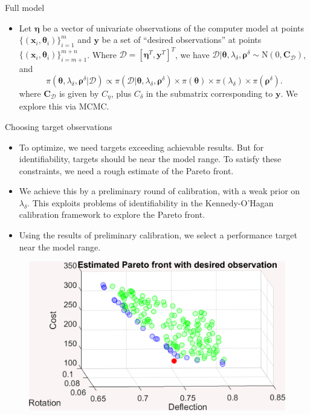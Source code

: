\documentclass[final]{beamer}
\newlength{\onecolwid}
\begin{document}
\begin{frame}[t]
\begin{columns}[t]
\begin{column}{\onecolwid}
\begin{alertblock}{Full model}
\begin{itemize}
\item Let $\boldsymbol\eta$ be a vector of univariate observations of the computer model at points $\{(\mathbf x_i,\boldsymbol\theta_i)\}_{i=1}^m$ and $\mathbf y$ be a set of ``desired observations'' at points $\{(\mathbf x_i,\boldsymbol\theta_i)\}_{i=m+1}^{m+n}$. Where $\mathcal D=[\boldsymbol\eta^T,\mathbf y^T]^T$, we have $\mathcal D|\boldsymbol \theta,\lambda_\delta,\boldsymbol\rho^\delta\sim\mathrm N(0,\mathbf C_{\mathcal D})$, and 
\[
\pi(\boldsymbol\theta,\lambda_\delta,\boldsymbol\rho^\delta|\mathcal D) \propto
\pi(\mathcal D|\boldsymbol\theta,\lambda_\delta,\boldsymbol\rho^\delta)\times
\pi(\boldsymbol\theta) \times
\pi(\lambda_\delta) \times
\pi(\boldsymbol\rho^\delta).
\]
where $\mathbf C_{\mathcal D}$ is given by $C_\eta$, plus $C_\delta$ in the submatrix corresponding to $\mathbf y$. We explore this via MCMC.

\end{itemize}

\end{alertblock} 



\begin{alertblock}{Choosing target observations}

\begin{itemize}
\item To optimize, we need targets exceeding achievable results. But for identifiability, targets should be near the model range. To satisfy these constraints,\! we need a rough estimate of the Pareto front.

\item We achieve this by a preliminary round of calibration, with a weak prior on $\lambda_\delta$. This exploits problems of identifiability in the Kennedy-O'Hagan calibration framework\cite{Kennedy2001} to explore the Pareto front.

\item Using the results of preliminary calibration, we select a performance target near the model range.

\end{itemize}

\begin{figure}[h!]
\includegraphics[width=.85\linewidth]{FIG_est_PF_with_des_obs}
\label{est_PF}
\end{figure}



\end{alertblock}
\end{column}
\end{columns}
\end{frame}
\end{document}
